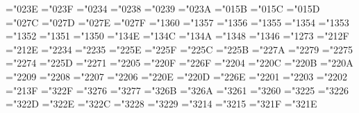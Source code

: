 {  \def\surd{{\mathchar"1270}}
  \mathchardef\top="023E
  \mathchardef\bot="023F
  \def\angle{{\vbox{\ialign{$\m@th\scriptstyle####$\crcr
      \not\mathrel{\mkern14mu}\crcr
      \noalign{\nointerlineskip}
      \mkern2.5mu\leaders\hrule height.34pt\hfill\mkern2.5mu\crcr}}}}
  \mathchardef\triangle="0234
  \mathchardef\forall="0238
  \mathchardef\exists="0239
  \mathchardef\neg="023A \let\lnot=\neg
  \mathchardef\flat="015B
  \mathchardef\natural="015C
  \mathchardef\sharp="015D
  \mathchardef\clubsuit="027C
  \mathchardef\diamondsuit="027D
  \mathchardef\heartsuit="027E
  \mathchardef\spadesuit="027F
  \mathchardef\coprod="1360
  \mathchardef\bigvee="1357
  \mathchardef\bigwedge="1356
  \mathchardef\biguplus="1355
  \mathchardef\bigcap="1354
  \mathchardef\bigcup="1353
  \mathchardef\intop="1352 \def\int{\intop\nolimits}
  \mathchardef\prod="1351
  \mathchardef\sum="1350
  \mathchardef\bigotimes="134E
  \mathchardef\bigoplus="134C
  \mathchardef\bigodot="134A
  \mathchardef\ointop="1348 \def\oint{\ointop\nolimits}
  \mathchardef\bigsqcup="1346
  \mathchardef\smallint="1273
  \mathchardef\triangleleft="212F
  \mathchardef\triangleright="212E
  \mathchardef\bigtriangleup="2234
  \mathchardef\bigtriangledown="2235
  \mathchardef\wedge="225E \let\land=\wedge
  \mathchardef\vee="225F \let\lor=\vee
  \mathchardef\cap="225C
  \mathchardef\cup="225B
  \mathchardef\ddagger="227A
  \mathchardef\dagger="2279
  \mathchardef\sqcap="2275
  \mathchardef\sqcup="2274
  \mathchardef\uplus="225D
  \mathchardef\amalg="2271
  \mathchardef\diamond="2205
  \mathchardef\bullet="220F
  \mathchardef\wr="226F
  \mathchardef\div="2204
  \mathchardef\odot="220C
  \mathchardef\oslash="220B
  \mathchardef\otimes="220A
  \mathchardef\ominus="2209
  \mathchardef\oplus="2208
  \mathchardef\mp="2207
  \mathchardef\pm="2206
  \mathchardef\circ="220E
  \mathchardef\bigcirc="220D
  \mathchardef\setminus="226E
  \mathchardef\cdot="2201
  \mathchardef\ast="2203
  \mathchardef\times="2202
  \mathchardef\star="213F
  \mathchardef\propto="322F
  \mathchardef\sqsubseteq="3276
  \mathchardef\sqsupseteq="3277
  \mathchardef\parallel="326B
  \mathchardef\mid="326A
  \mathchardef\dashv="3261
  \mathchardef\vdash="3260
  \mathchardef\nearrow="3225
  \mathchardef\searrow="3226
  \mathchardef\nwarrow="322D
  \mathchardef\swarrow="322E
  \mathchardef\Leftrightarrow="322C
  \mathchardef\Leftarrow="3228
  \mathchardef\Rightarrow="3229
  \def\neq{\not=} 
  \let\ne=\neq 
  \mathchardef\leq="3214 \let\le=\leq
  \mathchardef\geq="3215 \let\ge=\geq
  \mathchardef\succ="321F
  \mathchardef\prec="321E
}

